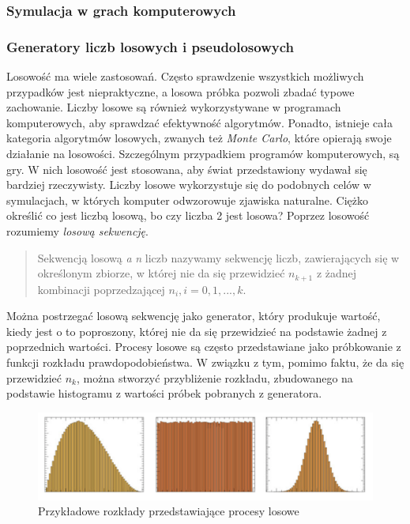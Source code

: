 \subsubsection{\texorpdfstring{Symulacja w grach komputerowych \autocite{vogel:simulation}}{Symulacja w grach komputerowych }}\label{symulacja-w-grach-komputerowych}

\subsubsection{\texorpdfstring{Generatory liczb losowych i pseudolosowych \autocite{Ecuyer:rng} \autocite{Hellekalek:rng} \autocite{Ecuyer:simulation:rng} \autocite{Kneusel2018RandomNA}}{Generatory liczb losowych i pseudolosowych    }}\label{generatory-liczb-losowych-i-pseudolosowych}

Losowość ma wiele zastosowań. Często sprawdzenie wszystkich możliwych przypadków jest niepraktyczne, a losowa próbka pozwoli zbadać typowe zachowanie. Liczby losowe są również wykorzystywane w programach komputerowych, aby sprawdzać efektywność algorytmów. Ponadto, istnieje cała kategoria algorytmów losowych, zwanych też \emph{Monte Carlo}, które opierają swoje działanie na losowości. Szczególnym przypadkiem programów komputerowych, są gry. W nich losowość jest stosowana, aby świat przedstawiony wydawał się bardziej rzeczywisty. Liczby losowe wykorzystuje się do podobnych celów w symulacjach, w których komputer odwzorowuje zjawiska naturalne.
Ciężko określić co jest liczbą losową, bo czy liczba 2 jest losowa? Poprzez losowość rozumiemy \emph{losową sekwencję}.

\begin{quote}
Sekwencją losową \emph{a} \emph{n} liczb nazywamy sekwencję liczb, zawierających się w określonym zbiorze, w której nie da się przewidzieć \(n_{k+1}\) z żadnej kombinacji poprzedzającej \(n_i, i = 0,1,...,k\).
\end{quote}

Można postrzegać losową sekwencję jako generator, który produkuje wartość, kiedy jest o to poproszony, której nie da się przewidzieć na podstawie żadnej z poprzednich wartości.
Procesy losowe są często przedstawiane jako próbkowanie z funkcji rozkładu prawdopodobieństwa. W związku z tym, pomimo faktu, że da się przewidzieć \(n_k\), można stworzyć przybliżenie rozkładu, zbudowanego na podstawie histogramu z wartości próbek pobranych z generatora.

\begin{figure}[htbp]
\centering
\includegraphics[width=140mm]{graphics/distributions.png}
\caption{Przykładowe rozkłady przedstawiające procesy losowe \autocite{Kneusel2018RandomNA}}
\end{figure}


